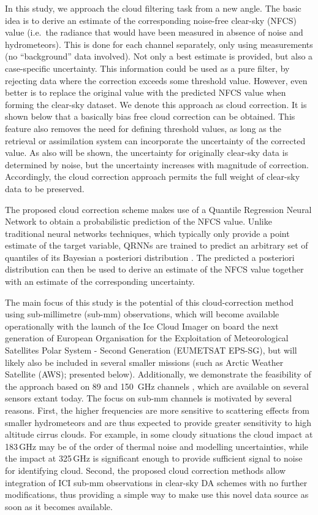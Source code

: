 \documentclass[amt, manuscript]{copernicus}
\begin{document}
In this study, we approach the cloud filtering task from a new angle. The basic idea
is to derive an estimate of the corresponding noise-free clear-sky (NFCS) value
(i.e.\ the radiance that would have been measured in absence of noise and
hydrometeors). This is done for each channel separately, only using
measurements (no ``background'' data involved). Not only a best estimate is
provided, but also a case-specific uncertainty. This information could be used as a pure filter, by rejecting data where the correction exceeds some threshold value. However, even
better is to replace the original value with the predicted NFCS value when
forming the clear-sky dataset. We denote this approach as cloud correction. It
is shown below that a basically bias free cloud correction can be obtained.
This feature also removes the need for defining threshold values, as long as the retrieval or
assimilation system can incorporate the uncertainty of the corrected value. As
also will be shown, the uncertainty for originally clear-sky data is determined
by noise, but the uncertainty increases with magnitude of correction.
Accordingly, the cloud correction approach permits the full weight of
clear-sky data to be preserved.

The proposed cloud correction scheme makes use of a Quantile Regression Neural
Network \cite[QRNN,][]{pfreundschuh:aneur:18} to obtain a probabilistic prediction of the NFCS value. Unlike traditional neural networks techniques, which typically only provide a point
estimate of the target variable, QRNNs are trained to predict an arbitrary set
of quantiles of its Bayesian a posteriori distribution
\citep{pfreundschuh:aneur:18}. The predicted a posteriori distribution 
can then be used to derive an estimate of the NFCS value together with an estimate
of the corresponding uncertainty.

The main focus of this study is the potential of this cloud-correction
method using sub-millimetre (sub-mm) observations, which will become available
operationally with the launch of the Ice Cloud Imager \citep[ICI,][]{eriksson:towar:20} on board the next generation of European Organisation for the Exploitation of Meteorological Satellites Polar System - Second Generation (EUMETSAT EPS-SG), but will likely also be included in
several smaller missions (such as Arctic Weather Satellite (AWS); presented
below). Additionally, we demonstrate the feasibility of the approach based on
89 and 150\ GHz channels \citep[following][]{geer2015scatteringindex}, which are available on several sensors extant today. The focus
on sub-mm channels is motivated by several reasons. First, the higher
frequencies are more sensitive to scattering effects from smaller
hydrometeors and are thus expected to provide greater sensitivity to high altitude cirrus clouds. For example, in some cloudy situations the
cloud impact at 183\,GHz may be of the order of thermal noise and modelling uncertainties,
while the impact at 325\,GHz is significant enough to provide sufficient signal to noise for identifying cloud. Second, the proposed
cloud correction methods allow integration of ICI sub-mm observations in
clear-sky DA schemes with no further modifications, thus providing a simple
way to make use this novel data source as soon as it becomes available.
\end{document}
